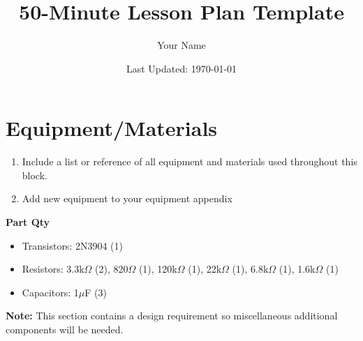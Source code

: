 \documentclass[12pt, letterpaper]{article}
\title{50-Minute Lesson Plan Template}
\author{Your Name}
\date{Last Updated: \today}
\begin{document}
\maketitle


\section*{Equipment/Materials}
\begin{enumerate}
    \item Include a list or reference of all equipment and materials used throughout this block.
    \item Add new equipment to your equipment appendix
\end{enumerate}

\textbf{Part Qty}
\begin{itemize}
    \item Transistors: 2N3904 (1)
    \item Resistors: 3.3k$\Omega$ (2), 820$\Omega$ (1), 120k$\Omega$ (1), 22k$\Omega$ (1), 6.8k$\Omega$ (1), 1.6k$\Omega$ (1)
    \item Capacitors: 1$\mu$F (3)
\end{itemize}

\textbf{Note:} This section contains a design requirement so miscellaneous additional components will be needed.

\newpage


\newpage


\newpage

\end{document}
